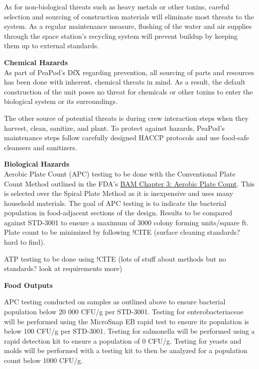 As for non-biological threats such as heavy metals or other toxins, careful selection and sourcing of construction materials will eliminate most threats to the system. As a regular maintenance measure, flushing of the water and air supplies through the space station's recycling system will prevent buildup by keeping them up to external standards.

\textbf{Chemical Hazards}\\
As part of PeaPod's DfX regarding prevention, all sourcing of parts and resources has been done with inherent, chemical threats in mind. As a result, the default construction of the unit poses no threat for chemicals or other toxins to enter the biological system or its surroundings.

The other source of potential threats is during crew interaction steps when they harvest, clean, sanitize, and plant. To protect against hazards, PeaPod's maintenance steps follow carefully designed HACCP protocols and use food-safe cleansers and sanitizers.


\textbf{Biological Hazards}\\
Aerobic Plate Count (APC) testing to be done with the Conventional Plate Count Method outlined in the FDA's \href{https://www.fda.gov/food/laboratory-methods-food/bam-chapter-3-aerobic-plate-count}{BAM Chapter 3: Aerobic Plate Count}. This is selected over the Spiral Plate Method as it is inexpensive and uses many household materials. The goal of APC testing is to indicate the bacterial population in food-adjacent sections of the design. Results to be compared against STD-3001 to ensure a maximum of 3000 colony forming units/square ft. Plate count to be minimized by following !CITE (surface cleaning standards? hard to find). 

ATP testing to be done using !CITE (lots of stuff about methods but no standards? look at requirements more)

\textbf{Food Outputs}


APC testing conducted on samples as outlined above to ensure bacterial population below 20 000 CFU/g per STD-3001. Testing for enterobacteriaceae will be performed using the MicroSnap EB rapid test to ensure its population is below 100 CFU/g per STD-3001. Testing for salmonella will be performed using a rapid detection kit to ensure a population of 0 CFU/g.
 Testing for yeasts and molds will be performed with a testing kit to then be analyzed for a population count below 1000 CFU/g.

